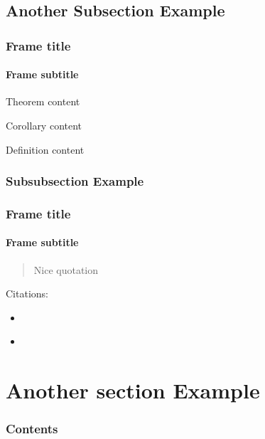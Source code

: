 \subsection[A. Subsection]{Another Subsection Example}
\begin{frame}
  \frametitle{Frame title}
  \framesubtitle{Frame subtitle}

  \begin{theorem}
    Theorem content
  \end{theorem}

  \begin{corollary}
    Corollary content
  \end{corollary}

  \begin{definition}
    Definition content
  \end{definition}
\end{frame}

\subsubsection[Subsubsection]{Subsubsection Example}
\begin{frame}
  \frametitle{Frame title}
  \framesubtitle{Frame subtitle}

  \begin{quote}
    Nice quotation
  \end{quote}

  \vspace{1em}
  
  Citations: 
  \begin{itemize}
    \item \cite{test2010, test2013, test2011}
    \item \scriptsize{}
  \end{itemize}

  \begin{refs}
    \scriptsize{}
  \end{refs}

\end{frame}

\section[A. Section]{Another section Example}
\begin{frame}
  \frametitle{Contents}
  \tableofcontents[%
    currentsection, %
  ]
\end{frame}


